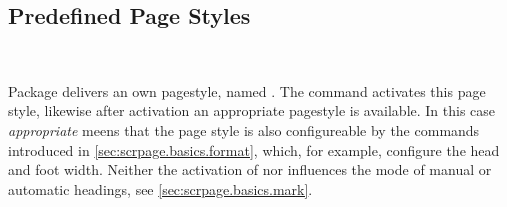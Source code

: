 \subsection{Predefined Page Styles}\label{sec:scrpage.basics.buildIn}

\begin{Declaration}
  \\
\end{Declaration}%
%
%
%
Package  delivers an own pagestyle, named
.
The command  activates
this page style, likewise
after activation an appropriate  pagestyle
is available.
In this case \emph{appropriate} meens that the 
page style is also configureable by the commands introduced in
\autoref{sec:scrpage.basics.format}, which, for example,
configure the head and foot width.
Neither the activation of  nor 
influences the mode of manual or automatic headings,
see \autoref{sec:scrpage.basics.mark}.

